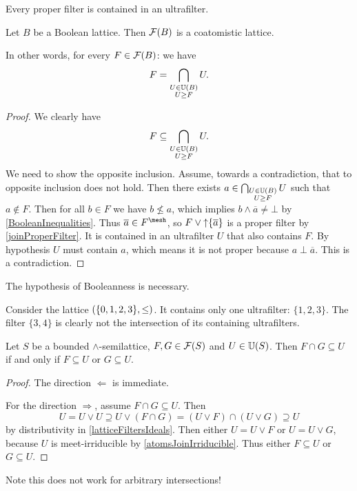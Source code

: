 \begin{proposition} \label{ultrafilterLemma}
Every proper filter is contained in an ultrafilter.
\end{proposition}
\begin{corollary} \label{filtersCoatomistic}
Let $B$ be a Boolean lattice. Then $\operatorname{\mathcal{F}}(B)$ is a coatomistic lattice.
\end{corollary}
In other words, for every $F\in \operatorname{\mathcal{F}}(B)$: we have
\[ F = \bigcap_{\substack{U\in \operatorname{\mathbb{U}}(B) \\ U\geq F}} U. \]
\begin{proof}
We clearly have
\[ F \subseteq \bigcap_{\substack{U\in \operatorname{\mathbb{U}}(B) \\ U\geq F}} U. \]
We need to show the opposite inclusion. Assume, towards a contradiction, that to opposite inclusion does not hold. Then there exists $a\in \bigcap_{\substack{U\in \operatorname{\mathbb{U}}(B) \\ U\geq F}} U$ such that $a\notin F$. Then for all $b\in F$ we have $b\not\leq a$, which implies $b\wedge \overline{a} \neq \bot$ by \ref{BooleanInequalities}. Thus $\overline{a} \in F^\mesh$, so $F\vee \operatorname{\uparrow}\{\overline{a}\}$ is a proper filter by \ref{joinProperFilter}. It is contained in an ultrafilter $U$ that also contains $F$. By hypothesis $U$ must contain $a$, which means it is not proper because $a\perp \overline{a}$. This is a contradiction.
\end{proof}
The hypothesis of Booleanness is necessary.
\begin{example}
Consider the lattice $\left( \{0,1,2,3\},\leq \right)$. It contains only one ultrafilter: $\{1,2,3\}$. The filter $\{3,4\}$ is clearly not the intersection of its containing ultrafilters.
\end{example}

\begin{lemma} \label{finiteUltrafilterFactorisation}
Let $S$ be a bounded $\wedge$-semilattice, $F, G\in \operatorname{\mathcal{F}}(S)$ and $U\in\operatorname{\mathbb{U}}(S)$. Then $F\cap G \subseteq U$ \textup{if and only if} $F\subseteq U$ or $G\subseteq U$.
\end{lemma}
\begin{proof}
The direction $\Leftarrow$ is immediate.

For the direction $\Rightarrow$, assume $F\cap G \subseteq U$. Then
\[ U = U\vee U \supseteq U\vee (F\cap G) = (U\vee F)\cap (U\vee G) \supseteq U \]
by distributivity in \ref{latticeFiltersIdeals}. Then either $U = U\vee F$ or $U = U\vee G$, because $U$ is meet-irriducible by \ref{atomsJoinIrriducible}. Thus either $F\subseteq U$ or $G\subseteq U$.
\end{proof}
Note this does not work for arbitrary intersections!

